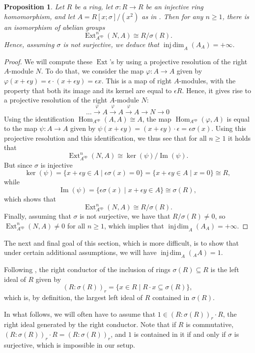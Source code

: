 \documentclass{amsart}
\newtheorem{prop}[equation]{Proposition}
\theoremstyle{definition}
\newcommand{\opn}{\operatorname}
\newcommand{\injdim}{\operatorname{inj\,dim}}
\numberwithin{equation}{section}
\begin{document}
\begin{prop}\label{prop:infinjdim}
Let $R$ be a ring, let $\sigma:R \to R$ be an injective ring homomorphism,
and let $A = R[x;\sigma]/(x^2)$ as in .
Then for any $n \ge 1$,
there is an isomorphism of abelian groups
\[
\opn{Ext}^n_{A^{\opn{op}}}(N,A) \cong R/\sigma(R).
\]
Hence, assuming $\sigma$ is not surjective,
we deduce that $\injdim_A(A_A) = +\infty$.
\end{prop}
\begin{proof}
We will compute these $\opn{Ext}$'s by using a projective resolution of the right $A$-module $N$.
To do that, 
we consider the map $\varphi:A \to A$ given by $\varphi(x+\epsilon y) = \epsilon \cdot (x+\epsilon y) = \epsilon x$. This is a map of right $A$-modules, with the property that both its image and its kernel are equal to $\epsilon R$. Hence,
it gives rise to a projective resolution of the right $A$-module $N$:
\[
\dots \xrightarrow{\varphi} A \xrightarrow{\varphi} A \xrightarrow{\varphi} A \to N \to 0
\]
Using the identification $\opn{Hom}_{A^{\opn{op}}}(A,A) \cong A$,
the map $\opn{Hom}_{A^{\opn{op}}}(\varphi,A)$ is equal to the map $\psi:A \to A$
given by $\psi(x+\epsilon y)= (x+\epsilon y)\cdot \epsilon = \epsilon \sigma(x)$.
Using this projective resolution and this identification, we
thus see that for all $n \ge 1$ it holds that
\[
\opn{Ext}^n_{A^{\opn{op}}}(N,A) \cong \ker(\psi)/\opn{Im}(\psi).
\]
But since $\sigma$ is injective
\[
\ker(\psi) = \{x+\epsilon y \in A \mid \epsilon \sigma(x) = 0\} = \{x+\epsilon y \in A \mid x = 0\} \cong R,
\]
while
\[
\opn{Im}(\psi) = \{\epsilon \sigma(x) \mid x + \epsilon y \in A\} \cong \sigma(R),
\]
which shows that 
\[
\opn{Ext}^n_{A^{\opn{op}}}(N,A) \cong R/\sigma(R).
\]
Finally, assuming that $\sigma$ is not surjective,
we have that $R/\sigma(R) \ne 0$,
so $\opn{Ext}^n_{A^{\opn{op}}}(N,A) \ne 0$ for all $n\ge 1$,
which implies that $\injdim_A(A_A) = +\infty$.
\end{proof}

The next and final goal of this section, which is more difficult, is to show that under certain additional assumptions,
we will have $\injdim_A( \phantom{ }_A A) = 1$.

Following \cite[Definition 2.6]{Nic}, the right conductor of the inclusion of rings $\sigma(R) \subseteq R$ is the left ideal of $R$ given by
\[
(R:\sigma(R))_r = \{x \in R \mid R\cdot x \subseteq \sigma(R)\},
\]
which is, by definition, the largest left ideal of $R$ contained in $\sigma(R)$.

In what follows, we will often have to assume that $1 \in (R:\sigma(R))_r\cdot R$, the right ideal generated by the right conductor.
Note that if $R$ is commutative, 
$(R:\sigma(R))_r\cdot R = (R:\sigma(R))_r$, and $1$ is contained in it if and only if $\sigma$ is surjective, which is impossible in our setup.
\end{document}
